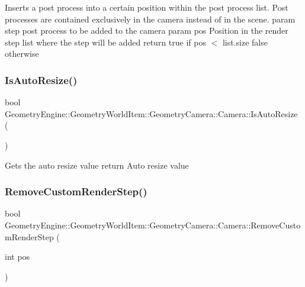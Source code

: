 Inserts a post process into a certain position within the post process list. Post processes are contained exclusively in the camera instead of in the scene. param step post process to be added to the camera param pos Position in the render step list where the step will be added return true if pos $<$ list.\+size false otherwise \mbox{\label{class_geometry_engine_1_1_geometry_world_item_1_1_geometry_camera_1_1_camera_a48e1e7bfc2aea19d21ecf5a311815740}} 
\subsubsection{\texorpdfstring{IsAutoResize()}{IsAutoResize()}}
{\footnotesize\ttfamily bool Geometry\+Engine\+::\+Geometry\+World\+Item\+::\+Geometry\+Camera\+::\+Camera\+::\+Is\+Auto\+Resize (\begin{DoxyParamCaption}{ }\end{DoxyParamCaption})\hspace{0.3cm}{\ttfamily [inline]}}

Gets the auto resize value return Auto resize value \mbox{\label{class_geometry_engine_1_1_geometry_world_item_1_1_geometry_camera_1_1_camera_adb12d29b67837c4d5e5c94f6cb956bbd}} 
\subsubsection{\texorpdfstring{RemoveCustomRenderStep()}{RemoveCustomRenderStep()}}
{\footnotesize\ttfamily bool Geometry\+Engine\+::\+Geometry\+World\+Item\+::\+Geometry\+Camera\+::\+Camera\+::\+Remove\+Custom\+Render\+Step (\begin{DoxyParamCaption}\item[{int}]{pos }\end{DoxyParamCaption})\hspace{0.3cm}{\ttfamily [virtual]}}


